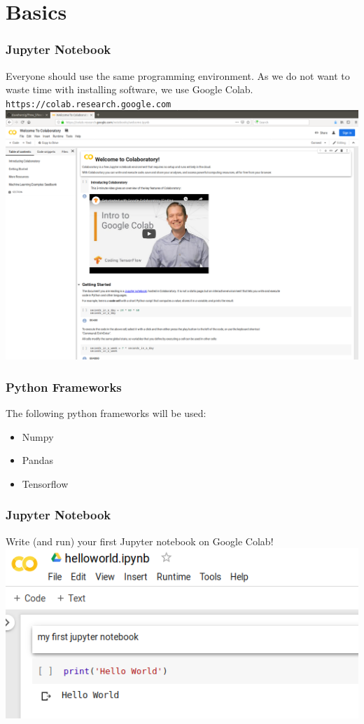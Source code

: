 \section{Basics}

\begin{frame}[fragile]
  \frametitle{Jupyter Notebook}
  Everyone should use the same programming environment. As we do not want to waste time with
  installing software, we use Google Colab.\\
  \verb|https://colab.research.google.com|\\
  \vspace{3mm}
  \includegraphics[scale=0.1]{img/jupyter_notebook}
\end{frame}


\begin{frame}[fragile]
  \frametitle{Python Frameworks}
  The following python frameworks will be used:
  \begin{itemize}
  \item Numpy
  \item Pandas
  \item Tensorflow
  \end{itemize}
\end{frame}

\begin{frame}[fragile]
  \frametitle{Jupyter Notebook}
  \begin{exercise}
  Write (and run) your first Jupyter notebook on Google Colab!
  \includegraphics[scale=0.5]{img/jupyter_notebook_exercise}
  \end{exercise}
\end{frame}


